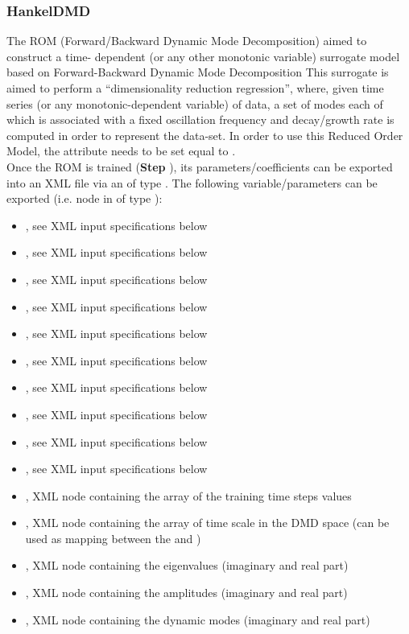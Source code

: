 \subsubsection{HankelDMD}
  The  ROM (Forward/Backward Dynamic Mode Decomposition) aimed to construct a time-
  dependent (or any other monotonic     variable) surrogate model based on Forward-Backward Dynamic
  Mode Decomposition     This surrogate is aimed to perform a ``dimensionality reduction
  regression'', where, given time     series (or any monotonic-dependent variable) of data, a set of
  modes each of which is associated     with a fixed oscillation frequency and decay/growth rate is
  computed     in order to represent the data-set.     In order to use this Reduced Order Model, the
   attribute      needs to be set equal to .     \\
  Once the ROM  is trained (\textbf{Step} ), its parameters/coefficients can be
  exported into an XML file     via an  of type . The following
  variable/parameters  can be exported (i.e.  node     in  of type
  ):     \begin{itemize}       \item {}, see XML input
  specifications below       \item {}, see XML input specifications below
  \item {}, see XML input specifications below       \item {}, see XML input
  specifications below       \item {}, see XML input specifications below
  \item {}, see XML input specifications below       \item {}, see
  XML input specifications below       \item {}, see XML input specifications
  below       \item {}, see XML input specifications below       \item
  , see XML input specifications below       \item {}, XML node
  containing the array of the training time steps values       \item {}, XML
  node containing the array of time scale in the DMD space (can be used as mapping       between the
   and )       \item {}, XML node containing
  the eigenvalues (imaginary and real part)       \item {}, XML node containing
  the amplitudes (imaginary and real part)       \item {}, XML node containing the
  dynamic modes (imaginary and real part)     \end{itemize}

